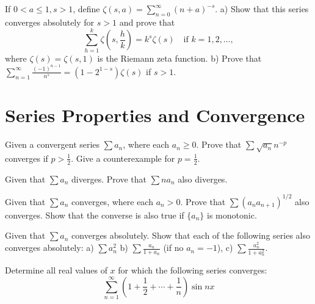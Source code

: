     \begin{problembox}
    If \(0 < a \leq 1, s > 1\), define \(\zeta(s, a) = \sum_{n=0}^{\infty} (n + a)^{-s}\).
    a) Show that this series converges absolutely for \(s > 1\) and prove that
    \[\sum_{h=1}^{k} \zeta \left( s, \frac{h}{k} \right) = k^s \zeta(s) \quad \text{if } k = 1, 2, \ldots,\]
    where \(\zeta(s) = \zeta(s, 1)\) is the Riemann zeta function.
    b) Prove that \(\sum_{n=1}^{\infty} \frac{(-1)^{n-1}}{n^s} = (1 - 2^{1-s}) \zeta(s)\) if \(s > 1\).
    \end{problembox}

\section{Series Properties and Convergence}

\begin{problembox}
    Given a convergent series \(\sum a_n\), where each \(a_n \geq 0\). Prove that \(\sum \sqrt{a_n} n^{-p}\) converges if \(p > \frac{1}{2}\). Give a counterexample for \(p = \frac{1}{2}\).
    \end{problembox}
    
    \begin{problembox}
    Given that \(\sum a_n\) diverges. Prove that \(\sum n a_n\) also diverges.
    \end{problembox}
    
    \begin{problembox}
    Given that \(\sum a_n\) converges, where each \(a_n > 0\). Prove that \(\sum (a_n a_{n+1})^{1/2}\) also converges. Show that the converse is also true if \(\{a_n\}\) is monotonic.
    \end{problembox}
    
    \begin{problembox}
    Given that \(\sum a_n\) converges absolutely. Show that each of the following series also converges absolutely:
    a) \(\sum a_n^2\) b) \(\sum \frac{a_n}{1 + a_n}\) (if no \(a_n = -1\)),
    c) \(\sum \frac{a_n^2}{1 + a_n^2}\).
    \end{problembox}
    
    \begin{problembox}
    Determine all real values of \(x\) for which the following series converges:
    \[\sum_{n=1}^{\infty} \left( 1 + \frac{1}{2} + \cdots + \frac{1}{n} \right) \sin nx\]
    \end{problembox}
    
